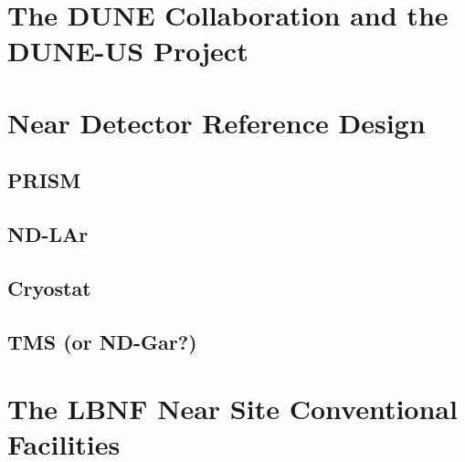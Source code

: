 \section{The DUNE Collaboration and the DUNE-US Project}
\label{intro:collab-proj}


\section{Near Detector Reference Design}
\label{intro:refdes}



\subsection{PRISM}
\label{intro:refdes-prism}



\subsection{ND-LAr}
\label{intro:refdes-ndlar}

\subsection{Cryostat}
\label{intro:refdes-cryostat}

\subsection{TMS (or ND-Gar?)}
\label{intro:refdes-tms}





\section{The LBNF Near Site Conventional Facilities}
\label{intro:lbnf}



